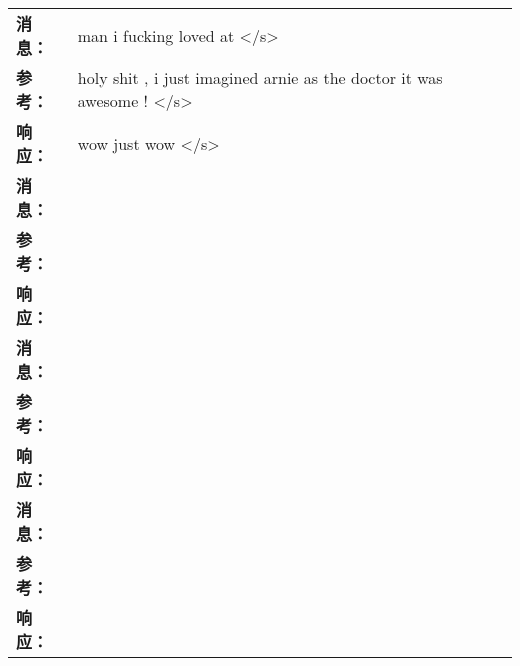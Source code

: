 \begin{table}[H]
    \centering
    \begin{tabularx}{\textwidth}{lX}
        \toprule
        \textbf{消息：} & man i fucking loved at </s>  \\
        \textbf{参考：} & holy shit , i just imagined arnie as the doctor it was awesome ! </s>  \\
        \textbf{响应：} & wow just wow </s> \\
        \midrule
        \textbf{消息：} & \\
        \textbf{参考：} & \\
        \textbf{响应：} & \\
        \midrule
        \textbf{消息：} & \\
        \textbf{参考：} & \\
        \textbf{响应：} & \\
        \midrule
        \textbf{消息：} & \\
        \textbf{参考：} & \\
        \textbf{响应：} & \\
        \bottomrule
    \end{tabularx}
\end{table}